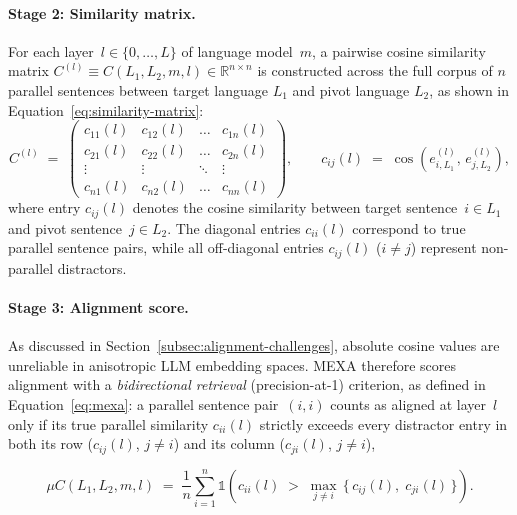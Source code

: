 \paragraph{Stage 2: Similarity matrix.}
For each layer~$l \in \{0, \dots, L\}$ of language model~$m$, a pairwise cosine similarity matrix $C^{(l)} \equiv C(L_1, L_2, m, l) \in \mathbb{R}^{n \times n}$ is constructed across the full corpus of $n$ parallel sentences between target language $L_1$ and pivot language $L_2$, as shown in Equation~\eqref{eq:similarity-matrix}:
\begin{equation}
    C^{(l)} \;=\;
    \begin{pmatrix}
        c_{11}(l) & c_{12}(l) & \dots & c_{1n}(l) \\
        c_{21}(l) & c_{22}(l) & \dots & c_{2n}(l) \\
        \vdots    & \vdots    & \ddots & \vdots    \\
        c_{n1}(l) & c_{n2}(l) & \dots & c_{nn}(l)
    \end{pmatrix},
    \qquad
    c_{ij}(l) \;=\; \cos\!\left(e_{i, L_1}^{(l)},\, e_{j, L_2}^{(l)}\right),
    \label{eq:similarity-matrix}
\end{equation}
where entry $c_{ij}(l)$ denotes the cosine similarity between target sentence~$i \in L_1$ and pivot sentence~$j \in L_2$. The diagonal entries $c_{ii}(l)$ correspond to true parallel sentence pairs, while all off-diagonal entries $c_{ij}(l)$ ($i \neq j$) represent non-parallel distractors.

\paragraph{Stage 3: Alignment score.}
As discussed in Section~\ref{subsec:alignment-challenges}, absolute cosine values are unreliable in anisotropic LLM embedding spaces. MEXA therefore scores alignment with a \emph{bidirectional retrieval} (precision-at-1) criterion, as defined in Equation~\eqref{eq:mexa}: a parallel sentence pair~$(i, i)$ counts as aligned at layer~$l$ only if its true parallel similarity $c_{ii}(l)$ strictly exceeds every distractor entry in both its row ($c_{ij}(l)$, $j \neq i$) and its column ($c_{ji}(l)$, $j \neq i$),

\begin{equation}
    \mu C(L_1, L_2, m, l)
    \;=\;
    \frac{1}{n}
    \sum_{i=1}^{n}
    \mathbb{1}\!\left(
        c_{ii}(l) \;>\; \max_{j \neq i}\,\{\, c_{ij}(l),\; c_{ji}(l) \,\}
    \right).
    \label{eq:mexa}
\end{equation}

